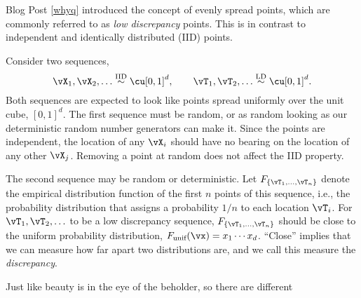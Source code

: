 Blog Post \ref{whyq} introduced the concept of evenly spread points, which are commonly referred to as \emph{low discrepancy} points.  This is in contrast to independent and identically distributed (IID) points.  

Consider two sequences,
\begin{equation}
    \vX_1, \vX_2, \ldots \overset{\text{IID}}{\sim} \cu[0,1]^d, \qquad \vT_1, \vT_2, \ldots \overset{\text{LD}}{\sim} \cu[0,1]^d.
\end{equation}
Both sequences are expected to look like points spread uniformly over the unit cube, $[0,1]^d$.  
The first sequence must be random, or as random looking as our deterministic random number generators can make it.  Since the points are independent, the location of any $\vX_i$ should have no bearing on the location of any other $\vX_j$.  Removing a point at random does not affect the IID property.

The second sequence may be random or deterministic.  Let $F_{\{\vT_1, \ldots, \vT_n\}}$ denote the empirical distribution function of the first $n$ points of this sequence, i.e., the probability distribution that assigns a probability $1/n$ to each location $\vT_i$.  For $\vT_1, \vT_2, \ldots$ to be a low discrepancy sequence, $F_{\{\vT_1, \ldots, \vT_n\}}$ should be close to the uniform probability distribution, $F_{\text{unif}}(\vx) = x_1 \cdots x_d$.  ``Close'' implies that we can measure how far apart two distributions are, and we call this measure the \emph{discrepancy}.

Just like beauty is in the eye of the beholder, so there are different  

\cite{Hic97a}